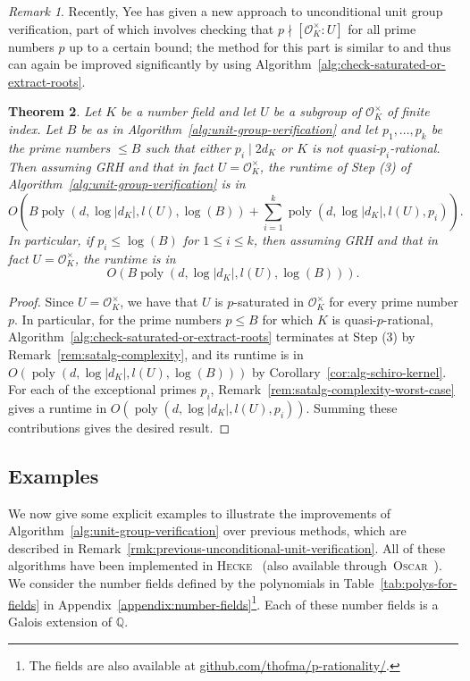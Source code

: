 \documentclass[12pt, a4paper, usenames]{amsart}
\newcommand{\Q}{\mathbb{Q}}
\theoremstyle{plain}
\newtheorem{theorem}{Theorem}[section]
\theoremstyle{remark}
\newtheorem{remark}[theorem]{Remark}
\theoremstyle{definition}
\DeclareMathOperator{\poly}{poly}
\begin{document}
\begin{remark}
Recently, Yee \cite{yee2025unconditional} has given a new 
approach to unconditional unit group verification, part of 
which involves checking that $p \nmid [\mathcal{O}_{K}^{\times} : U]$ for all prime numbers $p$
up to a certain bound; the method for this part is similar to
\cite[Algorithm~4.9]{MR4440537} and thus can again be improved significantly by using Algorithm~\ref{alg:check-saturated-or-extract-roots}.
\end{remark}

\begin{theorem}
Let $K$ be a number field and let $U$ be a subgroup of $\mathcal{O}_{K}^{\times}$
of finite index. 
Let $B$ be as in Algorithm~\ref{alg:unit-group-verification} and 
let $p_{1},\dotsc,p_{k}$ be the prime numbers $\leq B$ such that either $p_{i} \mid 2d_{K}$ or $K$ is not quasi-$p_{i}$-rational. 
Then assuming GRH and that in fact $U=\mathcal{O}_{K}^{\times}$,
the runtime of Step (3) of Algorithm~\ref{alg:unit-group-verification} is in
  \[ 
  O\left(B\poly(d, \log\lvert d_K\rvert, l(U), \log(B)) + \sum_{i=1}^{k} \poly(d, \log\lvert d_K\rvert, l(U), p_i )\right).
  \]
  In particular, if $p_i \leq \log(B)$ for $1 \leq i \leq k$, then assuming GRH 
  and that in fact $U=\mathcal{O}_{K}^{\times}$, the runtime is in 
  \[ 
  O(B\poly(d, \log\lvert d_K\rvert, l(U), \log(B))).
  \]
\end{theorem}

\begin{proof}
Since $U=\mathcal{O}_{K}^{\times}$, we have that $U$ is $p$-saturated in $\mathcal{O}_{K}^{\times}$ for every prime number $p$.
In particular, for the prime numbers $p \leq B$ for which $K$ is quasi-$p$-rational, Algorithm~\ref{alg:check-saturated-or-extract-roots} terminates at Step (3) 
by Remark~\ref{rem:satalg-complexity},
and its runtime is in
$O(\poly(d, \log\lvert  d_K\rvert, l(U), \log(B)))$ by Corollary~\ref{cor:alg-schiro-kernel}.
For each of the exceptional primes $p_{i}$, Remark~\ref{rem:satalg-complexity-worst-case}
gives a runtime in $O(\poly(d, \log |d_{K}|, l(U), p_{i}))$.
Summing these contributions gives the desired result. 
\end{proof}

\subsection{Examples}\label{subsec:example:uncond}
We now give some explicit examples to illustrate the improvements 
of Algorithm~\ref{alg:unit-group-verification} 
over previous methods, which are described in Remark~\ref{rmk:previous-unconditional-unit-verification}.
All of these algorithms have been implemented in
\textsc{Hecke}~\cite{MR3703682} (also available through~\textsc{Oscar}~\cite{OSCAR-book}).
We consider the number fields defined by the polynomials in Table~\ref{tab:polys-for-fields} in Appendix~\ref{appendix:number-fields}\footnote{The fields are also available at \url{github.com/thofma/p-rationality/}.}.
Each of these number fields is a Galois extension of $\Q$.
\end{document}
